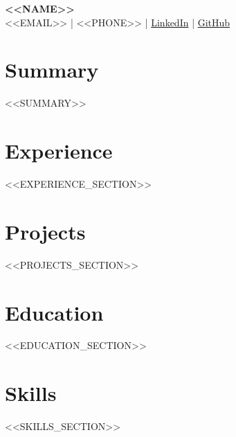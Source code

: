 \documentclass[11pt,a4paper]{article}
\begin{document}
\begin{center}
    {\Huge \textbf{<<NAME>>}} \\
    \vspace{1mm}
    <<EMAIL>> | <<PHONE>> | \href{https://<<LINKEDIN>>}{LinkedIn} | \href{https://<<GITHUB>>}{GitHub}
\end{center}

\section*{Summary}
<<SUMMARY>>

\section*{Experience}
<<EXPERIENCE_SECTION>>

\section*{Projects}
<<PROJECTS_SECTION>>

\section*{Education}
<<EDUCATION_SECTION>>

\section*{Skills}
<<SKILLS_SECTION>>
\end{document}
